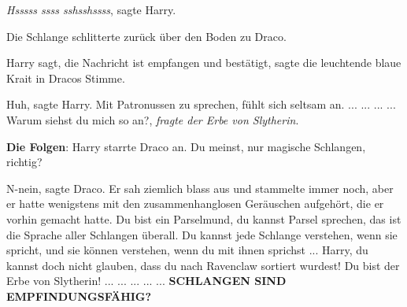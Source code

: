 \glqq{}\emph{Hsssss ssss sshsshssss}\grqq{}, sagte Harry.

Die Schlange schlitterte zurück über den Boden zu Draco.

\glqq{}Harry sagt, die Nachricht ist empfangen und bestätigt\grqq{}, sagte die
leuchtende blaue Krait in Dracos Stimme.

\glqq{}Huh\grqq{}, sagte Harry. \glqq{}Mit Patronussen zu sprechen, fühlt sich
seltsam an.\grqq{} ... ... ... ... \glqq{}Warum siehst du mich so an?\grqq{},
\emph{fragte der Erbe von Slytherin}.

\textbf{Die Folgen}: Harry starrte Draco an. \glqq{}Du meinst, nur magische
Schlangen, richtig?\grqq{}

\glqq{}N-nein\grqq{}, sagte Draco. Er sah ziemlich blass aus und stammelte immer
noch, aber er hatte wenigstens mit den zusammenhanglosen Geräuschen aufgehört,
die er vorhin gemacht hatte. \glqq{}Du bist ein Parselmund, du kannst Parsel
sprechen, das ist die Sprache aller Schlangen überall. Du kannst jede Schlange
verstehen, wenn sie spricht, und sie können verstehen, wenn du mit ihnen
sprichst ... Harry, du kannst doch nicht glauben, dass du nach Ravenclaw sortiert
wurdest! Du bist der Erbe von Slytherin!\grqq{} ... ... ... ... ...
\textbf{SCHLANGEN SIND EMPFINDUNGSFÄHIG?}\grqq{}

